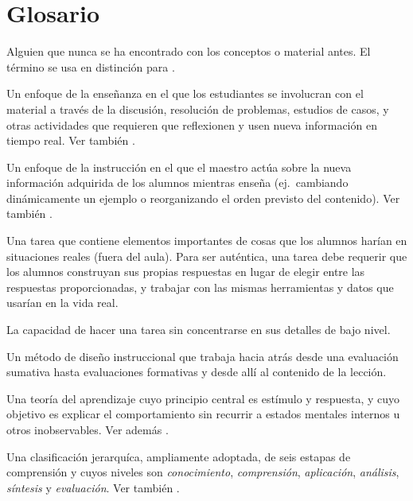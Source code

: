 \chapter{Glosario}\label{s:gloss}

\begin{description}

 Alguien que nunca se ha
encontrado con los conceptos o material antes. El término se usa en distinción para
.

 Un enfoque de la enseñanza en el que
los estudiantes se involucran con el material a través de la discusión, resolución de problemas, estudios de casos,
y otras actividades que requieren que reflexionen y usen nueva información en
tiempo real. Ver también .

 Un enfoque de la instrucción en el que el
maestro actúa sobre la nueva información adquirida de los alumnos mientras enseña (ej.\ cambiando
dinámicamente un ejemplo o reorganizando el orden previsto del contenido).
Ver también .

 Una tarea que contiene elementos importantes 
de cosas que los alumnos harían en situaciones reales (fuera del aula). Para 
ser auténtica, una tarea debe requerir que los alumnos construyan sus propias respuestas
en lugar de elegir entre las respuestas proporcionadas, y trabajar con las mismas 
herramientas y datos que usarían en la vida real.

 La capacidad de hacer una tarea sin 
concentrarse en sus detalles de bajo nivel.

 Un método de diseño instruccional que
trabaja hacia atrás desde una evaluación sumativa hasta evaluaciones formativas y desde allí
al contenido de la lección.

 Una teoría del aprendizaje cuyo principio central
es estímulo y respuesta, y cuyo objetivo es explicar el comportamiento sin recurrir
a estados mentales internos u otros inobservables. Ver
además .

 Una clasificación jerarquíca, ampliamente adoptada, 
de seis estapas de comprensión y cuyos niveles son \emph{conocimiento},
\emph{comprensión}, \emph{aplicación}, \emph{análisis}, \emph{síntesis} y
\emph{evaluación}. 
Ver también .


\end{description}
